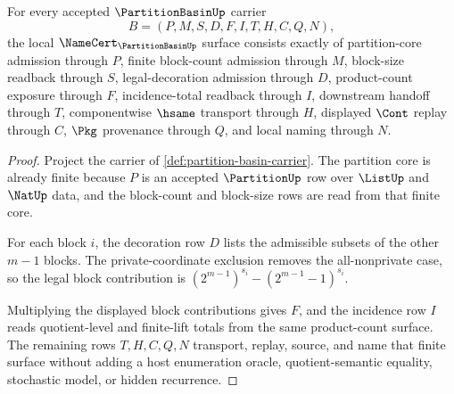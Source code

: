 \begin{theorem}
\label{thm:partition-basin-namecert-obligations}
For every accepted $\PartitionBasinUp$ carrier
$$
B=(P,M,S,D,F,I,T,H,C,Q,N),
$$
the local $\NameCert_{\PartitionBasinUp}$ surface consists exactly of partition-core admission through $P$, finite block-count admission through $M$, block-size readback through $S$, legal-decoration admission through $D$, product-count exposure through $F$, incidence-total readback through $I$, downstream handoff through $T$, componentwise $\hsame$ transport through $H$, displayed $\Cont$ replay through $C$, $\Pkg$ provenance through $Q$, and local naming through $N$.
\end{theorem}
\begin{proof}
Project the carrier of \autoref{def:partition-basin-carrier}. The partition core is already finite because $P$ is an accepted $\PartitionUp$ row over $\ListUp$ and $\NatUp$ data, and the block-count and block-size rows are read from that finite core.

For each block $i$, the decoration row $D$ lists the admissible subsets of the other $m-1$ blocks. The private-coordinate exclusion removes the all-nonprivate case, so the legal block contribution is $(2^{m-1})^{s_i}-(2^{m-1}-1)^{s_i}$.

Multiplying the displayed block contributions gives $F$, and the incidence row $I$ reads quotient-level and finite-lift totals from the same product-count surface. The remaining rows $T,H,C,Q,N$ transport, replay, source, and name that finite surface without adding a host enumeration oracle, quotient-semantic equality, stochastic model, or hidden recurrence.
\end{proof}


\begin{closurestatus}{\PartitionBasinUp}
  \theoryclosure{\seedClosure}
  \formalstatus{\unformalizedV}
\end{closurestatus}
